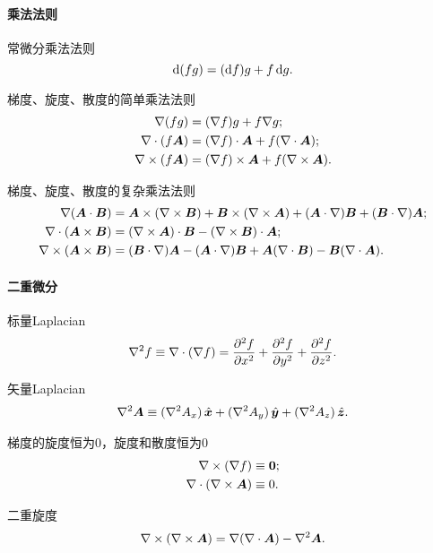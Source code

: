 \paragraph{乘法法则}
\begin{compactitem}
	\item 常微分乘法法则
    \[
        \d(fg)=(\d f)g+f\d g.
    \]
    \item 梯度、旋度、散度的简单乘法法则
    \begin{align}
        \nabla(fg)&=(\nabla f)g+f\nabla g;\\
        \div(f\bm A)&=(\nabla f)\cdot\bm A+f(\div\bm A);\\
        \curl(f\bm A)&=(\nabla f)\times\bm A+f(\curl\bm A).
    \end{align}
    \item 梯度、旋度、散度的复杂乘法法则
    \begin{align}
        \label{eqn:gradA.B}
        \nabla(\bm A\cdot\bm B)&=\bm A\times(\curl\bm B)+\bm B\times(\curl\bm A)+(\bm A\cdot\nabla)\bm B+(\bm B\cdot\nabla)\bm A;\\
        \label{eqn:divAxB}
        \div(\bm A\times\bm B)&=(\curl\bm A)\cdot\bm B-(\curl\bm B)\cdot\bm A;\\
        \label{eqn:curlAxB}
        \curl(\bm A\times\bm B)&=(\bm B\cdot\nabla)\bm A-(\bm A\cdot\nabla)\bm B+\bm A(\div\bm B)-\bm B(\div\bm A).
    \end{align}
\end{compactitem}
\paragraph{二重微分}
\begin{compactitem}
	\item 标量Laplacian
    \begin{align}
        \lapla f\equiv\div(\nabla f)=\pv[2]fx+\pv[2]fy+\pv[2]fz.
    \end{align}
	\item 矢量Laplacian
	\begin{align}
        \lapla\bm A\equiv(\nabla^2A_x)\uvec x+(\nabla^2A_y)\uvec y+(\nabla^2A_z)\uvec z.
    \end{align}
    \item 梯度的旋度恒为0，旋度和散度恒为0
    \begin{align}
        \label{eqn:curlgrad}
        \curl(\nabla f)&\equiv \bm 0;\\
        \label{eqn:divcurl}
        \div(\curl\bm A)&\equiv 0.
    \end{align}
    \item 二重旋度
    \begin{align}
        \label{eqn:curlcurl}
        \curl(\curl\bm A)=\nabla(\div\bm A)-\lapla\bm A.
    \end{align}
\end{compactitem}
